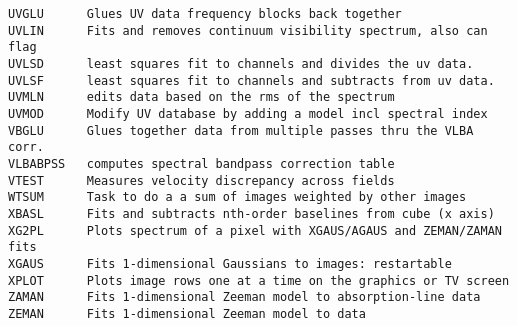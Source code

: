 \begin{verbatim}
UVGLU      Glues UV data frequency blocks back together
UVLIN      Fits and removes continuum visibility spectrum, also can flag
UVLSD      least squares fit to channels and divides the uv data.
UVLSF      least squares fit to channels and subtracts from uv data.
UVMLN      edits data based on the rms of the spectrum
UVMOD      Modify UV database by adding a model incl spectral index
VBGLU      Glues together data from multiple passes thru the VLBA corr.
VLBABPSS   computes spectral bandpass correction table
VTEST      Measures velocity discrepancy across fields
WTSUM      Task to do a a sum of images weighted by other images
XBASL      Fits and subtracts nth-order baselines from cube (x axis)
XG2PL      Plots spectrum of a pixel with XGAUS/AGAUS and ZEMAN/ZAMAN fits
XGAUS      Fits 1-dimensional Gaussians to images: restartable
XPLOT      Plots image rows one at a time on the graphics or TV screen
ZAMAN      Fits 1-dimensional Zeeman model to absorption-line data
ZEMAN      Fits 1-dimensional Zeeman model to data
\end{verbatim}\eve


